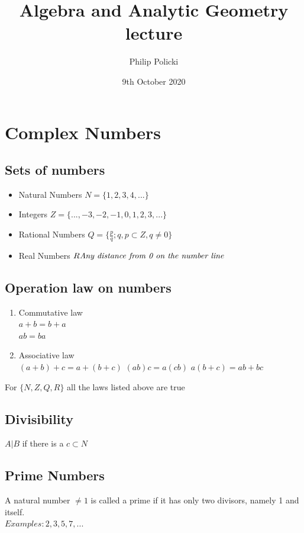 \documentclass{report}
\title{ Algebra and Analytic Geometry lecture }
\author{Philip Policki}
\date{9th October 2020}
\begin{document}
\graphicspath{{./imgs/}}
\maketitle
\tableofcontents
\pagebreak
\large
\chapter{Complex Numbers}
\section{Sets of numbers}
	\begin{itemize}
		\item Natural Numbers $N = \{1, 2, 3, 4, ...\}$
		\item Integers $Z = \{ ..., -3, -2, -1, 0, 1, 2, 3, ... \}$
		\item Rational Numbers $Q = \{  \frac{p}{q}; q,p \subset Z, q \neq 0  \}$
		\item Real Numbers $R \emph{Any distance from 0 on the number line}$
	\end{itemize}

\section{Operation law on numbers}

	\begin{enumerate}
	\item Commutative law \\ 
	$ a + b = b + a$ \\
	$ ab = ba $ 
	\item Associative law \\ 
	$ (a + b) + c = a + (b + c) $
	$ (ab)c = a(cb)$
	$ a(b+ c) = ab + bc $ 
	\end{enumerate}
For $\{N, Z, Q, R\}$ all the laws listed above are true 
\section{Divisibility}
	$A|B$  if there is a $c \subset N $
	
\section{Prime Numbers}
	A natural number $\neq 1$ is called a prime if it has only two divisors, namely 1 and itself. \\
	$Examples: 2, 3, 5, 7, ...$
	
\end{document}

